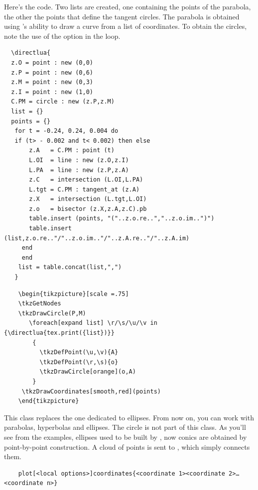 Here's the code. Two lists are created, one containing the points of the parabola, the other the points that define the tangent circles.
The parabola is obtained using \TIKZ{}'s ability to draw a curve from a list of coordinates. To obtain the circles, note the use of the  option in the  loop.

\begin{Verbatim}
  \directlua{
  z.O = point : new (0,0)
  z.P = point : new (0,6)
  z.M = point : new (0,3)
  z.I = point : new (1,0)
  C.PM = circle : new (z.P,z.M)
  list = {}
  points = {}
   for t = -0.24, 0.24, 0.004 do
   if (t> - 0.002 and t< 0.002) then else
       z.A   = C.PM : point (t)
       L.OI  = line : new (z.O,z.I)
       L.PA  = line : new (z.P,z.A)
       z.C   = intersection (L.OI,L.PA)
       L.tgt = C.PM : tangent_at (z.A)
       z.X   = intersection (L.tgt,L.OI)
       z.o   = bisector (z.X,z.A,z.C).pb
       table.insert (points, "("..z.o.re..","..z.o.im..")")
       table.insert (list,z.o.re.."/"..z.o.im.."/"..z.A.re.."/"..z.A.im)
     end
     end
    list = table.concat(list,",")
   }
\end{Verbatim}

  \begin{Verbatim}
    \begin{tikzpicture}[scale =.75]
    \tkzGetNodes
    \tkzDrawCircle(P,M)
       \foreach[expand list] \r/\s/\u/\v in {\directlua{tex.print({list})}}
        {
          \tkzDefPoint(\u,\v){A}
          \tkzDefPoint(\r,\s){o}
          \tkzDrawCircle[orange](o,A)
        }
     \tkzDrawCoordinates[smooth,red](points)
    \end{tikzpicture}
  \end{Verbatim}






This class replaces the one dedicated to ellipses. From now on, you can work with parabolas, hyperbolas and ellipses. The circle is not part of this class.
As you'll see from the examples, ellipses used to be built by \TIKZ{}, now conics are obtained by point-by-point construction. A cloud of points is sent to \TIKZ{}, which simply connects them.

\begin{mybox}
  \begin{Verbatim}
    plot[<local options>]coordinates{<coordinate 1><coordinate 2>…<coordinate n>} 
  \end{Verbatim}
\end{mybox}

